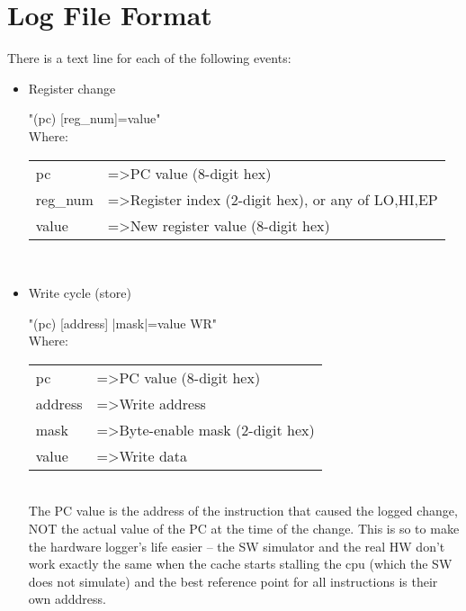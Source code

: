 \section{Log File Format}
\label{log_file_format}

    There is a text line for each of the following events:

    \begin{itemize}
    \item Register change

        "(pc) [reg\_num]=value"\\

        Where:
            
        \begin{tabular}{ l l }
            pc       & =\textgreater PC value (8-digit hex)\\
            reg\_num & =\textgreater Register index (2-digit hex), or any of {LO,HI,EP}\\
            value    & =\textgreater New register value (8-digit hex)\\
        \end{tabular}\\
       

    \item Write cycle (store)

        "(pc) [address] |mask|=value WR"\\

        Where:
        
        \begin{tabular}{ l l }
        pc      & =\textgreater PC value (8-digit hex)\\
        address & =\textgreater Write address\\
        mask    & =\textgreater Byte-enable mask (2-digit hex)\\
        value   & =\textgreater Write data\\
        \end{tabular}\\

        The PC value is the address of the instruction that caused the logged
        change, NOT the actual value of the PC at the time of the change. 
        This is so to make the hardware logger's life easier -- the SW simulator
        and the real HW don't work exactly the same when the cache starts 
        stalling the cpu (which the SW does not simulate) and the best reference
        point for all instructions is their own adddress.


\end{itemize}
